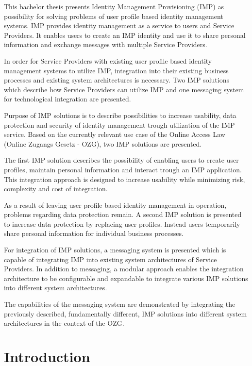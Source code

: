 \documentclass[
     12pt,         %
     a4paper,      %
     BCOR=10mm,version=first,     %
     DIV=14,version=first,        %
     ]{scrreprt}
\begin{document}
This bachelor thesis presents Identity Management Provisioning (IMP) as possibility for solving problems of user profile based identity management systems. IMP provides identity management as a service to users and Service Providers. It enables users to create an IMP identity and use it to share personal information and exchange messages with multiple Service Providers.

In order for Service Providers with existing user profile based identity management systems to utilize IMP, integration into their existing business processes and existing system architectures is necessary. Two IMP solutions which describe how Service Providers can utilize IMP and one messaging system for technological integration are presented.

Purpose of IMP solutions is to describe possibilities to increase usability, data protection and security of identity management trough utilization of the IMP service. Based on the currently relevant use case of the Online Access Law (Online Zugangs Gesetz - OZG), two IMP solutions are presented.

The first IMP solution describes the possibility of enabling users to create user profiles, maintain personal information and interact trough an IMP application. This integration approach is designed to increase usability while minimizing risk, complexity and cost of integration.

As a result of leaving user profile based identity management in operation, problems regarding data protection remain. A second IMP solution is presented to increase data protection by replacing user profiles. Instead users temporarily share personal information for individual business processes.   

For integration of IMP solutions, a messaging system is presented which is capable of integrating IMP into existing system architectures of Service Providers. In addition to messaging, a modular approach enables the integration architecture to be configurable and expandable to integrate various IMP solutions into different system architectures.

The capabilities of the messaging system are demonstrated by integrating the previously described, fundamentally different, IMP solutions into different system architectures in the context of the OZG.

\newpage

\tableofcontents
\cleardoublepage
{}

\chapter{Introduction}

\end{document}

